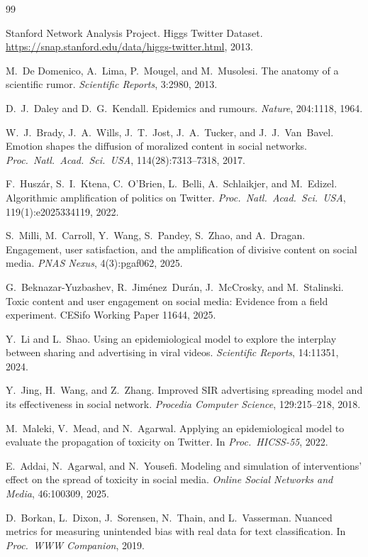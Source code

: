 \documentclass[11pt]{article}
\begin{document}
\begingroup
\footnotesize
\begin{thebibliography}{99}

Stanford Network Analysis Project.
Higgs Twitter Dataset.
\url{https://snap.stanford.edu/data/higgs-twitter.html}, 2013.

M.~De Domenico, A.~Lima, P.~Mougel, and M.~Musolesi.
The anatomy of a scientific rumor.
\textit{Scientific Reports}, 3:2980, 2013.

D.~J.~Daley and D.~G.~Kendall.
Epidemics and rumours.
\textit{Nature}, 204:1118, 1964.

W.~J.~Brady, J.~A.~Wills, J.~T.~Jost, J.~A.~Tucker, and J.~J.~Van~Bavel.
Emotion shapes the diffusion of moralized content in social networks.
\textit{Proc.\ Natl.\ Acad.\ Sci.\ USA}, 114(28):7313--7318, 2017.

F.~Husz\'{a}r, S.~I.~Ktena, C.~O'Brien, L.~Belli, A.~Schlaikjer, and M.~Edizel.
Algorithmic amplification of politics on Twitter.
\textit{Proc.\ Natl.\ Acad.\ Sci.\ USA}, 119(1):e2025334119, 2022.

S.~Milli, M.~Carroll, Y.~Wang, S.~Pandey, S.~Zhao, and A.~Dragan.
Engagement, user satisfaction, and the amplification of divisive content on social media.
\textit{PNAS Nexus}, 4(3):pgaf062, 2025.

G.~Beknazar-Yuzbashev, R.~Jim\'{e}nez~Dur\'{a}n, J.~McCrosky, and M.~Stalinski.
Toxic content and user engagement on social media: Evidence from a field experiment.
CESifo Working Paper 11644, 2025.

Y.~Li and L.~Shao.
Using an epidemiological model to explore the interplay between sharing and advertising in viral videos.
\textit{Scientific Reports}, 14:11351, 2024.

Y.~Jing, H.~Wang, and Z.~Zhang.
Improved SIR advertising spreading model and its effectiveness in social network.
\textit{Procedia Computer Science}, 129:215--218, 2018.

M.~Maleki, V.~Mead, and N.~Agarwal.
Applying an epidemiological model to evaluate the propagation of toxicity on Twitter.
In \textit{Proc.\ HICSS-55}, 2022.

E.~Addai, N.~Agarwal, and N.~Yousefi.
Modeling and simulation of interventions' effect on the spread of toxicity in social media.
\textit{Online Social Networks and Media}, 46:100309, 2025.

D.~Borkan, L.~Dixon, J.~Sorensen, N.~Thain, and L.~Vasserman.
Nuanced metrics for measuring unintended bias with real data for text classification.
In \textit{Proc.\ WWW Companion}, 2019.

\end{thebibliography}
\endgroup
\end{document}
